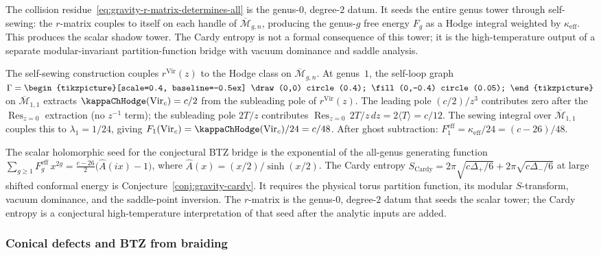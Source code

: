 The collision residue~\eqref{eq:gravity-r-matrix-determines-all}
is the genus-$0$, degree-$2$ datum. It seeds the entire genus
tower through self-sewing: the $r$-matrix couples to itself on
each handle of $\overline{\mathcal{M}}_{g,n}$, producing the
genus-$g$ free energy $F_g$ as a Hodge integral weighted by
$\kappa_{\mathrm{eff}}$. This produces the scalar shadow tower.
The Cardy entropy is not a formal consequence of this tower; it is
the high-temperature output of a separate modular-invariant
partition-function bridge with vacuum dominance and saddle analysis.

The self-sewing construction couples $r^{\mathrm{Vir}}(z)$
to the Hodge class on $\overline{\mathcal{M}}_{g,n}$. At
genus~$1$, the self-loop graph
$\Gamma = \vcenter{\hbox{\begin{tikzpicture}[scale=0.4,
 baseline=-0.5ex]
\draw (0,0) circle (0.4);
\fill (0,-0.4) circle (0.05);
\end{tikzpicture}}}$
on $\overline{\mathcal{M}}_{1,1}$ extracts
$\kappaChHodge(\mathrm{Vir}_c) = c/2$ from the subleading pole of
$r^{\mathrm{Vir}}(z)$. The leading pole $(c/2)/z^3$
contributes zero after the $\operatorname{Res}_{z=0}$
extraction (no $z^{-1}$ term); the subleading pole $2T/z$
contributes
$\operatorname{Res}_{z=0}\,2T/z\,dz = 2\langle T \rangle
= c/12$. The sewing integral over
$\overline{\mathcal{M}}_{1,1}$ couples this to
$\lambda_1 = 1/24$, giving
$F_1(\mathrm{Vir}_c)=\kappaChHodge(\mathrm{Vir}_c)/24 = c/48$.
After ghost subtraction:
$F_1^{\mathrm{eff}} = \kappa_{\mathrm{eff}}/24 = (c-26)/48$.

The scalar holomorphic seed for the conjectural BTZ bridge is the
exponential of the all-genus generating function
$\sum_{g \ge 1} F_g^{\mathrm{eff}}\,x^{2g}
= \frac{c-26}{2}\bigl(\hat{A}(ix) - 1\bigr)$,
where $\hat{A}(x) = (x/2)/\sinh(x/2)$. The Cardy entropy
$S_{\mathrm{Cardy}} =
2\pi\sqrt{c\Delta_+/6} + 2\pi\sqrt{c\Delta_-/6}$
at large shifted conformal energy is Conjecture~\ref{conj:gravity-cardy}.
It requires the physical torus partition function, its modular
$S$-transform, vacuum dominance, and the saddle-point inversion.
The $r$-matrix is the genus-$0$, degree-$2$ datum that seeds the
scalar tower; the Cardy entropy is a conjectural high-temperature
interpretation of that seed after the analytic inputs are added.

\subsubsection*{Conical defects and BTZ from braiding}

